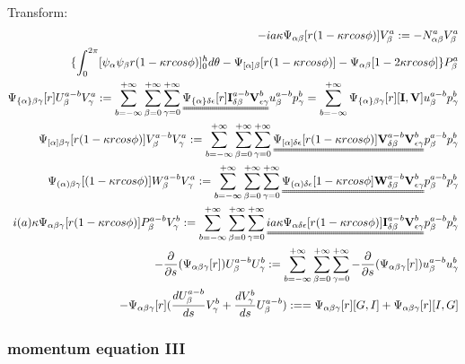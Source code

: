 \documentclass{Note}
\begin{document}
Transform:
\begin{equation}
\begin{aligned}
-ia\kappa \Psi_{\alpha\beta}[r(1-\kappa rcos\phi)]V_\beta^a:=-N_{\alpha\beta}^a V_\beta^a\\
\{\int_0^{2\pi}  [{\psi_\alpha \psi_\beta   r(1-\kappa r cos\phi)}]_0^h d\theta-\Psi_{[\alpha]\beta}[r(1-\kappa r cos\phi)]-\Psi_{\alpha\beta}[1-2\kappa r cos\phi]\}P_\beta^a\\
 \Psi_{\{\alpha\}\beta\gamma} [r]U_\beta^{a-b}V_\gamma^a:=\sum_{b=-\infty}^{+\infty} \sum_{\beta=0}^{+\infty}\sum_{\gamma=0}^{+\infty}\uuline{ \Psi_{\{\alpha\}\delta\epsilon}[r]\textbf{I}_{\delta\beta}^{a-b}\textbf{V}_{\epsilon\gamma}^{b}}u_\beta^{a-b}p_\gamma^{b}=\sum_{b=-\infty}^{+\infty}\Psi_{\{\alpha\}\beta\gamma}[r][\textbf{I},\textbf{V}]u_\beta^{a-b}p_\gamma^{b}\\
 \Psi_{[\alpha]\beta\gamma} [r(1-\kappa rcos\phi)]V_\beta^{a-b}V_\gamma^a:=\sum_{b=-\infty}^{+\infty} \sum_{\beta=0}^{+\infty}\sum_{\gamma=0}^{+\infty}\uuline{ \Psi_{[\alpha]\delta\epsilon}[r(1-\kappa r cos\phi)]\textbf{V}_{\delta\beta}^{a-b}\textbf{V}_{\epsilon\gamma}^{b}}p_\beta^{a-b}p_\gamma^{b}\\
\Psi_{(\alpha)\beta\gamma} [(1-\kappa rcos\phi)]W_\beta^{a-b}V_\gamma^a:=\sum_{b=-\infty}^{+\infty} \sum_{\beta=0}^{+\infty}\sum_{\gamma=0}^{+\infty}\uuline{ \Psi_{(\alpha)\delta\epsilon}[1-\kappa r cos\phi]\textbf{W}_{\delta\beta}^{a-b}\textbf{V}_{\epsilon\gamma}^{b}}p_\beta^{a-b}p_\gamma^{b}\\
 i(a)\kappa \Psi_{\alpha\beta\gamma}[r(1-\kappa r cos\phi)]P_\beta^{a-b}V_\gamma^{b}:=\sum_{b=-\infty}^{+\infty} \sum_{\beta=0}^{+\infty}\sum_{\gamma=0}^{+\infty}\uuline{ ia\kappa \Psi_{\alpha\delta\epsilon}[r(1-\kappa r cos\phi)]\textbf{I}_{\delta\beta}^{a-b}\textbf{V}_{\epsilon\gamma}^{b}}p_\beta^{a-b}p_\gamma^{b}\\
 -{{\partial }\over {\partial s}}(\Psi_{\alpha\beta\gamma}[r])U_\beta^{a-b}U_\gamma^{b}:=\sum_{b=-\infty}^{+\infty} \sum_{\beta=0}^{+\infty}\sum_{\gamma=0}^{+\infty}-{\partial\over \partial s} (\Psi_{\alpha\beta\gamma}[r])u_\beta^{a-b}u_\gamma^{b}\\
 -\Psi_{\alpha\beta\gamma}[r]({{d U_\beta^{a-b} \over {d s}}V_\gamma^{b}}+{dV_\gamma^{b}\over ds}U_\beta^{a-b}):==\Psi_{\alpha\beta\gamma}[r][G,I]+\Psi_{\alpha\beta\gamma}[r][I,G]\\
\end{aligned}
\end{equation}


\subsubsection{momentum equation III}
\end{document}
